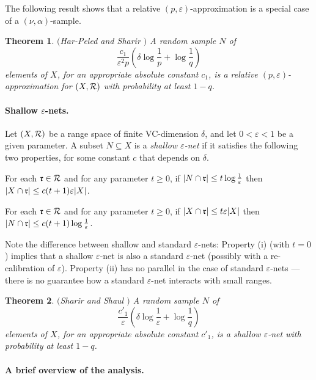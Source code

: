 \documentclass[11pt]{article}
\newtheorem{theorem}{Theorem}[section]
\newcounter{itemcounter}
\def\peps{(p,\varepsilon)}
\def\eps{\varepsilon}
\def\R{\cal{R}}
\def\r{\frak{r}}
\begin{document}
The following result shows that a relative $\peps$-approximation is a special case of a $(\nu,\alpha)$-sample.

\begin{theorem} \label{thm_relative_peps} $(${\emph{Har-Peled and Sharir} \bf \cite{hs11}}$)$ A random sample $N$ of
$$
\frac{c_{1}}{\eps^{2}p}\left(\delta \log \frac{1}{p} + \log \frac{1}{q} \right)
$$
elements of $X$, for an appropriate absolute constant $c_{1}$, is a relative $\peps$-approximation for $(X,\R)$ with probability at least $1-q$.
\end{theorem}

\paragraph{Shallow $\eps$-nets.}

Let $(X,\R)$ be a range space of finite VC-dimension $\delta$, and let $0 < \eps < 1$ be a given parameter. A subset $N \subseteq X$ is a \emph{shallow $\eps$-net} if it satisfies the following two properties, for some constant $c$ that depends on $\delta$.

\begin{list}{()}{ \leftmargin=2em}
\item For each $\r \in \R$ and for any parameter $t \geq 0$, if $|N \cap \r| \leq t\log\frac{1}{\eps}$ then $|X \cap \r| \leq c(t+1)\eps|X|$.
\item For each $\r \in \R$ and for any parameter $t \geq 0$, if $|X \cap \r| \leq t\eps|X|$ then
    $|N \cap \r| \leq c(t+1) \log \frac{1}{\eps}$.
\end{list}

Note the difference between shallow and standard $\eps$-nets: Property (i) (with $t=0$) implies that a shallow $\eps$-net is also a standard $\eps$-net (possibly with a re-calibration of
$\eps$). Property (ii) has no parallel in the case of standard $\eps$-nets --- there is no guarantee how a standard $\eps$-net interacts with small ranges.

\begin{theorem} \label{epsshallow} $(${\emph{Sharir and Shaul} \bf \cite{shsh11}}$)$
A random sample $N$ of
$$
\frac{c'_{1}}{\eps} \left( \delta \log\frac{1}{\eps} +
\log\frac{1}{q} \right)
$$
elements of $X$, for an appropriate absolute constant $c'_{1}$, is a shallow $\eps$-net with probability at least
$1-q$.
\end{theorem}

\paragraph{A brief overview of the analysis.}
\end{document}
